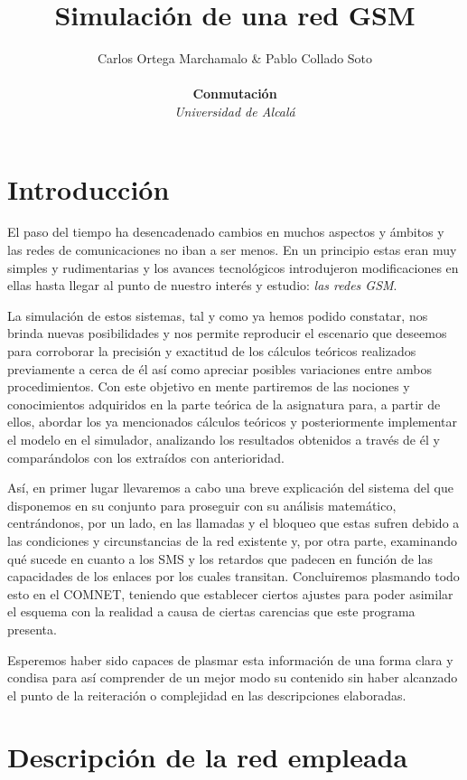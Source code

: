 \documentclass[12pt]{article}
\title{\textbf{Simulación de una red GSM}}
\author{Carlos Ortega Marchamalo \& Pablo Collado Soto \\ \\ \textbf{Conmutación} \\ \textit{Universidad de Alcalá}}
\date{}
\begin{document}
	\maketitle

	\newpage
	\tableofcontents
	\newpage

	\section{Introducción}
		El paso del tiempo ha desencadenado cambios en muchos aspectos y ámbitos y las redes de comunicaciones no iban a ser menos. En un principio estas eran muy simples y rudimentarias y los avances tecnológicos introdujeron modificaciones en ellas hasta llegar al punto de nuestro interés y estudio: \textit{las redes GSM}.

		La simulación de estos sistemas, tal y como ya hemos podido constatar, nos brinda nuevas posibilidades y nos permite reproducir el escenario que deseemos para corroborar la precisión y exactitud de los cálculos teóricos realizados previamente a cerca de él así como apreciar posibles variaciones entre ambos procedimientos. Con este objetivo en mente partiremos de las nociones y conocimientos adquiridos en la parte teórica de la asignatura para, a partir de ellos, abordar los ya mencionados cálculos teóricos y posteriormente implementar el modelo en el simulador, analizando los resultados obtenidos a través de él y comparándolos con los extraídos con anterioridad.

		Así, en primer lugar llevaremos a cabo una breve explicación del sistema del que disponemos en su conjunto para proseguir con su análisis matemático, centrándonos, por un lado, en las llamadas y el bloqueo que estas sufren debido a las condiciones y circunstancias de la red existente y, por otra parte, examinando qué sucede en cuanto a los SMS y los retardos que padecen en función de las capacidades de los enlaces por los cuales transitan. Concluiremos plasmando todo esto en el COMNET, teniendo que establecer ciertos ajustes para poder asimilar el esquema con la realidad a causa de ciertas carencias que este programa presenta.

		Esperemos haber sido capaces de plasmar esta información de una forma clara y condisa para así comprender de un mejor modo su contenido sin haber alcanzado el punto de la reiteración o complejidad en las descripciones elaboradas.

	\section{Descripción de la red empleada}
\end{document}

